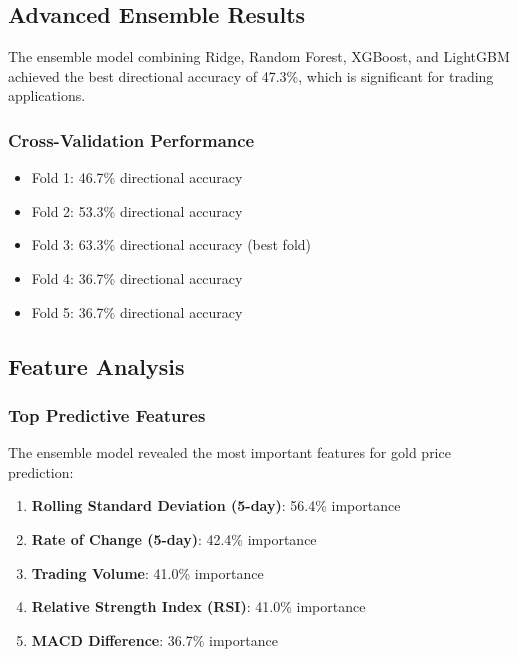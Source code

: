\documentclass[12pt,a4paper]{article}
\begin{document}
\subsection{Advanced Ensemble Results}

The ensemble model combining Ridge, Random Forest, XGBoost, and LightGBM achieved the best directional accuracy of 47.3\%, which is significant for trading applications.

\subsubsection{Cross-Validation Performance}
\begin{itemize}
    \item Fold 1: 46.7\% directional accuracy
    \item Fold 2: 53.3\% directional accuracy
    \item Fold 3: 63.3\% directional accuracy (best fold)
    \item Fold 4: 36.7\% directional accuracy
    \item Fold 5: 36.7\% directional accuracy
\end{itemize}

\subsection{Feature Analysis}

\subsubsection{Top Predictive Features}
The ensemble model revealed the most important features for gold price prediction:

\begin{enumerate}
    \item \textbf{Rolling Standard Deviation (5-day)}: 56.4\% importance
    \item \textbf{Rate of Change (5-day)}: 42.4\% importance
    \item \textbf{Trading Volume}: 41.0\% importance
    \item \textbf{Relative Strength Index (RSI)}: 41.0\% importance
    \item \textbf{MACD Difference}: 36.7\% importance
\end{enumerate}
\end{document}
